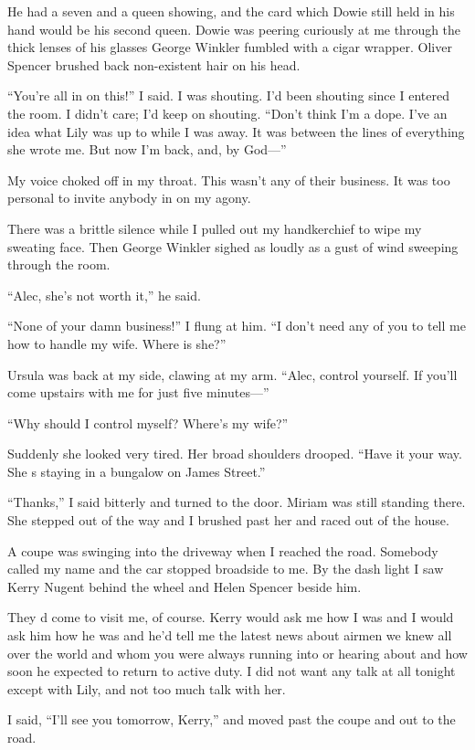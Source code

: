 \documentclass{novel}
\begin{document}
{He had a seven and a queen showing, and the card which Dowie still held in his hand would be his second queen. Dowie was peering curiously at me through the thick lenses of his glasses George Winkler fumbled with a cigar wrapper. Oliver Spencer brushed back non-existent hair on his head.

“You’re all in on this!” I said. I was shouting. I’d been shouting since I entered the room. I didn’t care; I’d keep on shouting. “Don’t think I’m a dope. I’ve an idea what Lily was up to while I was away. It was between the lines of everything she wrote me. But now I’m back, and, by God—”

My voice choked off in my throat. This wasn’t any of their business. It was too personal to invite anybody in on my agony.

There was a brittle silence while I pulled out my handkerchief to wipe my sweating face. Then George Winkler sighed as loudly as a gust of wind sweeping through the room.

“Alec, she’s not worth it,” he said.

“None of your damn business!” I flung at him. “I don’t need any of you to tell me how to handle my wife. Where is she?”

Ursula was back at my side, clawing at my arm. “Alec, control yourself. If you’ll come upstairs with me for just five minutes—”

“Why should I control myself? Where’s my wife?”

Suddenly she looked very tired. Her broad shoulders drooped. “Have it your way. She s staying in a bungalow on James Street.”

“Thanks,” I said bitterly and turned to the door. Miriam was still standing there. She stepped out of the way and I brushed past her and raced out of the house.

A coupe was swinging into the driveway when I reached the road. Somebody called my name and the car stopped broadside to me. By the dash light I saw Kerry Nugent behind the wheel and Helen Spencer beside him.

They d come to visit me, of course. Kerry would ask me how I was and I would ask him how he was and he’d tell me the latest news about airmen we knew all over the world and whom you were always running into or hearing about and how soon he expected to return to active duty. I did not want any talk at all tonight except with Lily, and not too much talk with her.

I said, “I’ll see you tomorrow, Kerry,” and moved past the coupe and out to the road.

}
\end{document}
